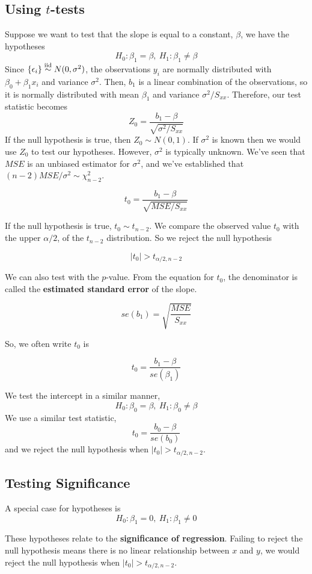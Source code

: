 \subsection{Using $t$-tests}

Suppose we want to test that the slope is equal to a constant, $\beta$, we have the hypotheses 
\[H_0: \beta_1 = \beta, \ H_1: \beta_1 \neq \beta\]
Since $\{\epsilon_i\} \overset{\mathrm{iid}}{\sim} N(0,\sigma^2)$, the observations $y_i$ are normally distributed with $\beta_0  + \beta_1x_i$ and variance $\sigma^2$. Then, $b_1$ is a linear combination of the observations, so it is normally distributed with mean $\beta_1$ and variance $\sigma^2/S_{xx}$. Therefore, our test statistic becomes 
\[Z_0 = \frac{b_1 - \beta}{\sqrt{\sigma^2/S_{xx}}}\]
If the null hypothesis is true, then $Z_0 \sim N(0,1)$. If $\sigma^2$ is known then we would use $Z_0$ to test our hypotheses. However, $\sigma^2$ is typically unknown. We've seen that $MSE$ is an unbiased estimator for $\sigma^2$, and we've established that $(n-2)MSE/\sigma^2 \sim \chi_{n-2}^2$.

\[t_0 = \frac{b_1 - \beta}{\sqrt{MSE/S_{xx}}}\]

If the null hypothesis is true, $t_0 \sim t_{n-2}$. We compare the observed value $t_0$ with the upper $\alpha/2$, of the $t_{n-2}$ distribution. So we reject the null hypothesis

\[|t_0| > t_{\alpha/2,n-2}\]

We can also test with the $p$-value. From the equation for $t_0$, the denominator is called the \textbf{estimated standard error} of the slope.  

\[se(b_1) = \sqrt{\frac{MSE}{S_{xx}}}\]

So, we often write $t_0$ is 

\[t_0 = \frac{b_1 - \beta}{se(\beta_1)}\]

We test the intercept in a similar manner, 
\[H_0: \beta_0 = \beta, \ H_1: \beta_0 \neq \beta\]
We use a similar test statistic,
\[t_0 = \frac{b_0 - \beta}{se(b_0)}\]
and we reject the null hypothesis when $|t_0| > t_{\alpha/2, n-2}$.

\subsection{Testing Significance}

A special case for hypotheses is 
\[H_0: \beta_1 = 0, \ H_1: \beta_1 \neq 0\]

These hypotheses relate to the \textbf{significance of regression}. Failing to reject the null hypothesis means there is no linear relationship between $x$ and $y$, we would reject the null hypothesis when $|t_0| > t_{\alpha/2, n-2}$. 


